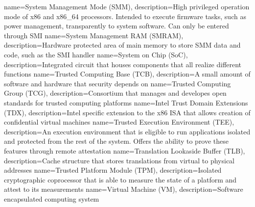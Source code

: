 {
  name=System Management Mode (SMM),
  description={High privileged operation mode of x86 and x86\_64 processors. Intended to execute firmware tasks, such
  as power management, transparently to system software. Can only be entered through SMI}
}
{
  name=System Management RAM (SMRAM),
  description={Hardware protected area of main memory to store SMM data and code, such as the
  SMI handler}
}
{
  name=System on Chip (SoC),
  description={Integrated circuit that houses components that all realize different functions}
}
%
{
  name=Trusted Computing Base (TCB),
  description={A small amount of software and hardware that security depends on}
}
{
  name=Trusted Computing Group (TCG),
  description={Consortium that manages and developes open standards for trusted computing platforms}
}
{
  name=Intel Trust Domain Extensions (TDX),
  description={Intel specific extension to the x86 ISA that allows creation of confidential virtual machines}
}
{
  name=Trusted Execution Environment (TEE),
  description={An execution environment that is eligible to run applications isolated and protected from the rest of
  the system. Offers the ability to prove these features through remote attestation}
}
{
  name=Translation Lookaside Buffer (TLB),
  description={Cache structure that stores translations from virtual to physical addresses}
}
{
  name=Trusted Platform Module (TPM),
  description={Isolated cryptographic coprocessor that is able to measure the state of a platform and attest to its measurements}
}
%
{
  name=Virtual Machine (VM),
  description={Software encapsulated computing system}
}
